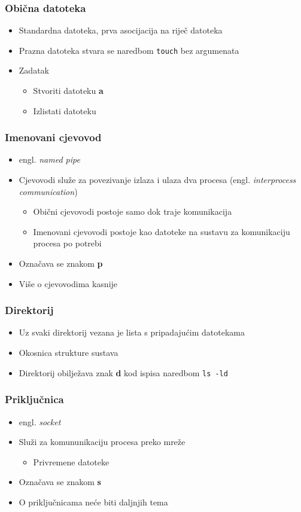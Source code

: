 \documentclass{beamer}
\newcommand{\shell}[1]{\texttt{#1}}
\begin{document}
\begin{frame}[t]
\frametitle{Obična datoteka} 
\begin{itemize}
  \item Standardna datoteka, prva asocijacija na riječ datoteka
  \item Prazna datoteka stvara se naredbom \shell{touch} bez argumenata
  \item Zadatak
  \begin{itemize}
    \item Stvoriti datoteku \textbf{a}
    \item Izlistati datoteku
  \end{itemize}
\end{itemize}
\end{frame}


\begin{frame}[t]
\frametitle{Imenovani cjevovod}
\begin{itemize}
  \item engl. \emph{named pipe}
  \item Cjevovodi služe za povezivanje izlaza i ulaza dva procesa (engl. 
        \emph{interprocess communication})
  \begin{itemize}
    \item Obični cjevovodi postoje samo dok traje komunikacija
    \item Imenovani cjevovodi postoje kao datoteke na sustavu za
          komunikaciju procesa po potrebi
  \end{itemize}
  \item Označava se znakom \textbf{p}
  \item Više o cjevovodima kasnije
\end{itemize}
\end{frame}

\begin{frame}[t]
\frametitle{Direktorij}
\begin{itemize}
  \item Uz svaki direktorij vezana je lista s pripadajućim datotekama
  \item Okosnica strukture sustava
  \item Direktorij obilježava znak \textbf{d} kod ispisa naredbom
        \shell{ls -ld} 
\end{itemize}
\end{frame}

\begin{frame}[t]
\frametitle{Priključnica}
\begin{itemize}
  \item engl. \emph{socket}
  \item Služi za komununikaciju procesa preko mreže 
  \begin{itemize}
    \item Privremene datoteke
  \end{itemize}
  \item Označava se znakom \textbf{s}
  \item O priključnicama neće biti daljnjih tema
\end{itemize}
\end{frame}
\end{document}
